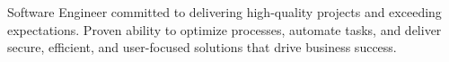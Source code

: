 

\begin{cvparagraph}

Software Engineer committed to delivering high-quality projects and exceeding expectations. Proven ability to optimize processes, automate tasks, and deliver secure, efficient, and user-focused solutions that drive business success.
\end{cvparagraph}
